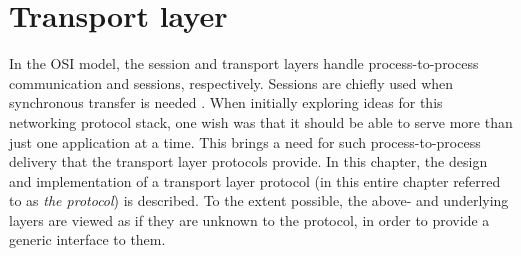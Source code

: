 \chapter{Transport layer}\label{chap:transport}
In the OSI model, the session and transport layers handle process-to-process communication and sessions, respectively. Sessions are chiefly used when synchronous transfer is needed \cite[39]{KOM}. When initially exploring ideas for this networking protocol stack, one wish was that it should be able to serve more than just one application at a time. This brings a need for such process-to-process delivery that the transport layer protocols provide. In this chapter, the design and implementation of a transport layer protocol (in this entire chapter referred to as \textit{the protocol}) is described. To the extent possible, the above- and underlying layers are viewed as if they are unknown to the protocol, in order to provide a generic interface to them.